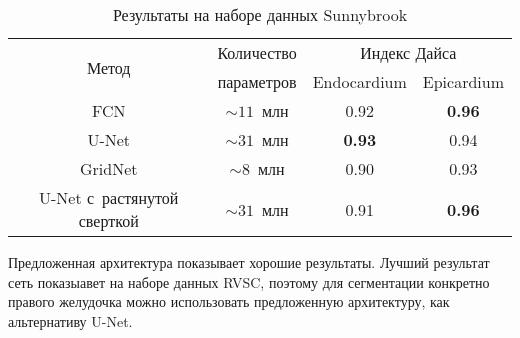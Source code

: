 \begin{table}[h]
\begin{center}
    \caption{Результаты на наборе данных Sunnybrook} \label{tab:sunnybrook_results}
    \begin{tabular}{ |c||*{3}{c|} }
      \hline
      \multirow{2}{*}{Метод}      & Количество   & \multicolumn{2}{c|}{Индекс Дайса} \\ \cline{3-4}
                                  & параметров   & Endocardium   & Epicardium        \\ \hline
      \hline
      FCN                         & $\sim11$~млн & 0.92          & \textbf{0.96}     \\ \hline
      U-Net                       & $\sim31$~млн & \textbf{0.93} & 0.94              \\ \hline
      GridNet                     &  $\sim8$~млн & 0.90          & 0.93              \\ \hline
      U-Net с~растянутой сверткой & $\sim31$~млн & 0.91          & \textbf{0.96}     \\ 
      \hline
    \end{tabular}
  \end{center}
\end{table}

Предложенная архитектура показывает хорошие результаты. Лучший результат сеть показыавет на наборе данных RVSC, поэтому для сегментации конкретно правого желудочка можно использовать предложенную архитектуру, как альтернативу U-Net.
